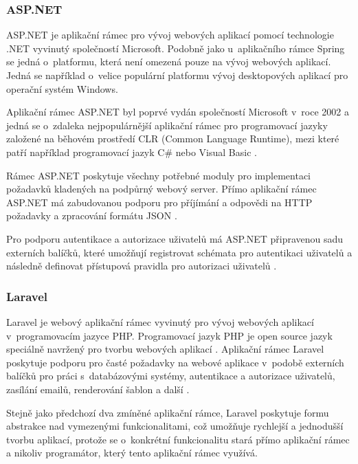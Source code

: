 \subsubsection{ASP.NET}

ASP.NET je aplikační rámec pro vývoj webových aplikací pomocí technologie .NET vyvinutý společností Microsoft. Podobně jako u~aplikačního rámce Spring se jedná o~platformu, která není omezená pouze na vývoj webových aplikací. Jedná se například o~velice populární platformu vývoj desktopových aplikací pro operační systém Windows.

Aplikační rámec ASP.NET byl poprvé vydán společností Microsoft v~roce 2002 \cite{bekker_microsoft_2002} a jedná se o~zdaleka nejpopulárnější aplikační rámec pro programovací jazyky založené na běhovém prostředí CLR (Common Language Runtime), mezi které patří například programovací jazyk C\# nebo Visual Basic \cite{warren_clr_2022}.

Rámec ASP.NET poskytuje všechny potřebné moduly pro implementaci požadavků kladených na podpůrný webový server. Přímo aplikační rámec ASP.NET má zabudovanou podporu pro příjímání a odpovědi na HTTP požadavky a zpracování formátu JSON \cite{dotnet_web_2023}.

Pro podporu autentikace a autorizace uživatelů má ASP.NET připravenou sadu externích balíčků, které umožňují registrovat schémata pro autentikaci uživatelů a následně definovat přístupová pravidla pro autorizaci uživatelů \cite{dotnet_security_2022}.

\subsubsection{Laravel}

Laravel je webový aplikační rámec vyvinutý pro vývoj webových aplikací v~programovacím jazyce PHP. Programovací jazyk PHP je open source jazyk speciálně navržený pro tvorbu webových aplikací \cite{what_is_php}. Aplikační rámec Laravel poskytuje podporu pro časté požadavky na webové aplikace v~podobě externích balíčků pro práci s~databázovými systémy, autentikace a autorizace uživatelů, zasílání emailů, renderování šablon a další \cite{laravel}. 

Stejně jako předchozí dva zmíněné aplikační rámce, Laravel poskytuje formu abstrakce nad vymezenými funkcionalitami, což umožňuje rychlejší a jednodušší tvorbu aplikací, protože se o~konkrétní funkcionalitu stará přímo aplikační rámec a nikoliv programátor, který tento aplikační rámec využívá.

